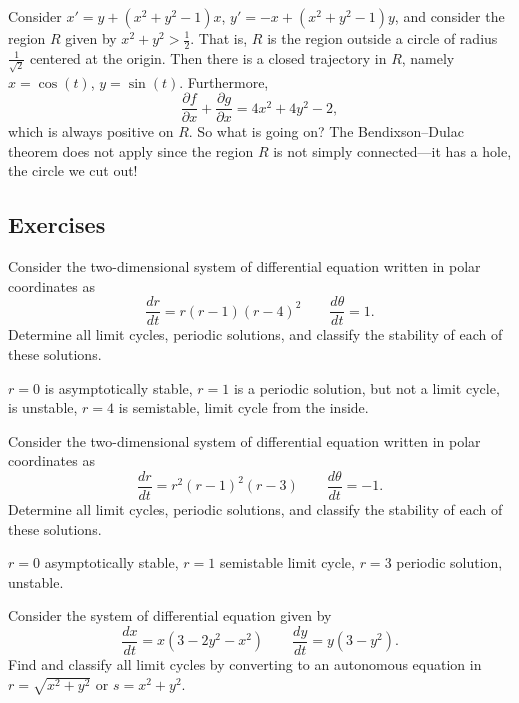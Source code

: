 \begin{example}
Consider
$x' = y+(x^2+y^2-1)x$, 
$y' = -x +(x^2+y^2-1)y$, and consider the region $R$ given by $x^2+y^2 >
\frac{1}{2}$.  That is, $R$ is the region outside a circle of radius
$\frac{1}{\sqrt{2}}$ centered at the origin.  Then
there is a closed trajectory in $R$, namely $x=\cos(t)$, $y=\sin(t)$.
Furthermore,
\begin{equation*}
\frac{\partial f}{\partial x} + 
\frac{\partial g}{\partial x} = 4x^2+4y^2-2 ,
\end{equation*}
which is always positive on $R$.  So what is going on?  The Bendixson--Dulac theorem does not
apply since the region $R$ is not simply connected---it has a hole, the
circle we cut out!
\end{example}


\subsection{Exercises}

\begin{exercise}
Consider the two-dimensional system of differential equation written in polar coordinates as
\[ \frac{dr}{dt} = r(r-1)(r-4)^2 \qquad \frac{d\theta}{dt} = 1. \] Determine all limit cycles, periodic solutions, and classify the stability of each of these solutions. 
\end{exercise}
\comboSol{%
}
{%
$r=0$ is asymptotically stable, $r=1$ is a periodic solution, but not a limit cycle, is unstable, $r=4$ is semistable, limit cycle from the inside.
}

\begin{exercise}
Consider the two-dimensional system of differential equation written in polar coordinates as
\[ \frac{dr}{dt} = r^2(r-1)^2(r-3) \qquad \frac{d\theta}{dt} = -1. \] Determine all limit cycles, periodic solutions, and classify the stability of each of these solutions. 
\end{exercise}
\comboSol{%
}
{%
$r=0$ asymptotically stable, $r=1$ semistable limit cycle, $r=3$ periodic solution, unstable.
}

\begin{exercise}\ansMark%
Consider the system of differential equation given by
\[ \frac{dx}{dt} = x(3- 2y^2 - x^2) \qquad \frac{dy}{dt} = y(3-y^2) .\]
Find and classify all limit cycles by converting to an autonomous equation in $r = \sqrt{x^2 + y^2}$ or $s = x^2 + y^2$. 
\end{exercise}

